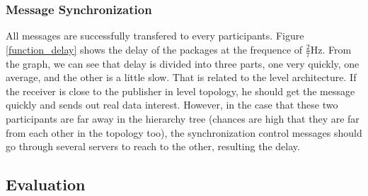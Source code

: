 \documentclass[conference]{IEEEtran}
\begin{document}
\subsubsection{Message Synchronization}
All messages are successfully transfered to every participants.
Figure \ref{function_delay} shows the delay of the packages at the frequence of $\frac{2}{7}$Hz.
From the graph, we can see that delay is divided into three parts,
one very quickly, one average, and the other is a little slow.
That is related to the level architecture.
If the receiver is close to the publisher in level topology,
he should get the message quickly and sends out real data interest.
However, in the case that these two participants are far away in the hierarchy tree
(chances are high that they are far from each other in the topology too),
the synchronization control messages should go through several servers to reach to the other, resulting the delay.

\subsection{Evaluation}
\end{document}

